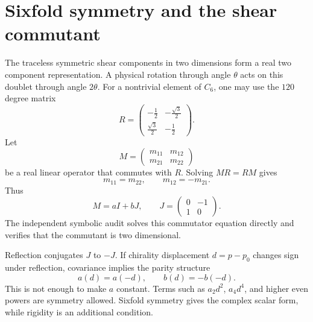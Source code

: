 \section{Sixfold symmetry and the shear commutant}
The traceless symmetric shear components in two dimensions form a real two component representation. A physical rotation through angle $\theta$ acts on this doublet through angle $2\theta$. For a nontrivial element of $C_6$, one may use the $120$ degree matrix
\begin{equation}
 R=\begin{pmatrix}
 -\tfrac12&-\tfrac{\sqrt3}{2}\\
 \tfrac{\sqrt3}{2}&-\tfrac12
 \end{pmatrix}.
 \label{eq:c6_rotation}
\end{equation}
Let
\begin{equation}
 M=\begin{pmatrix}m_{11}&m_{12}\\m_{21}&m_{22}\end{pmatrix}
 \label{eq:generic_m}
\end{equation}
be a real linear operator that commutes with $R$. Solving $MR=RM$ gives
\begin{equation}
 m_{11}=m_{22},
 \qquad
 m_{12}=-m_{21}.
 \label{eq:commutant_constraints}
\end{equation}
Thus
\begin{equation}
 M=aI+bJ,
 \qquad
 J=\begin{pmatrix}0&-1\\1&0\end{pmatrix}.
 \label{eq:commutant_form}
\end{equation}
The independent symbolic audit solves this commutator equation directly and verifies that the commutant is two dimensional.

Reflection conjugates $J$ to $-J$. If chirality displacement $d=p-p_0$ changes sign under reflection, covariance implies the parity structure
\begin{equation}
 a(d)=a(-d),
 \qquad
 b(d)=-b(-d).
 \label{eq:parity_ab}
\end{equation}
This is not enough to make $a$ constant. Terms such as $a_2d^2$, $a_4d^4$, and higher even powers are symmetry allowed. Sixfold symmetry gives the complex scalar form, while rigidity is an additional condition.

